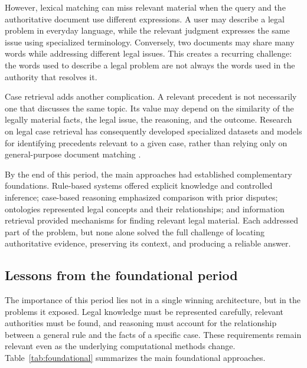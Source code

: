 However, lexical matching can miss relevant material when the query and the authoritative document
use different expressions. A user may describe a legal problem in everyday language, while the
relevant judgment expresses the same issue using specialized terminology. Conversely, two documents
may share many words while addressing different legal issues. This creates a recurring challenge: the
words used to describe a legal problem are not always the words used in the authority that resolves
it.

Case retrieval adds another complication. A relevant precedent is not necessarily one that discusses
the same topic. Its value may depend on the similarity of the legally material facts, the legal
issue, the reasoning, and the outcome. Research on legal case retrieval has consequently developed
specialized datasets and models for identifying precedents relevant to a given case, rather than
relying only on general-purpose document matching \citep{feng2024}.

By the end of this period, the main approaches had established complementary foundations. Rule-based
systems offered explicit knowledge and controlled inference; case-based reasoning emphasized
comparison with prior disputes; ontologies represented legal concepts and their relationships; and
information retrieval provided mechanisms for finding relevant legal material. Each addressed part of
the problem, but none alone solved the full challenge of locating authoritative evidence, preserving
its context, and producing a reliable answer.

\subsection{Lessons from the foundational period}

The importance of this period lies not in a single winning architecture, but in the problems it
exposed. Legal knowledge must be represented carefully, relevant authorities must be found, and
reasoning must account for the relationship between a general rule and the facts of a specific case.
These requirements remain relevant even as the underlying computational methods change.
Table~\ref{tab:foundational} summarizes the main foundational approaches.


